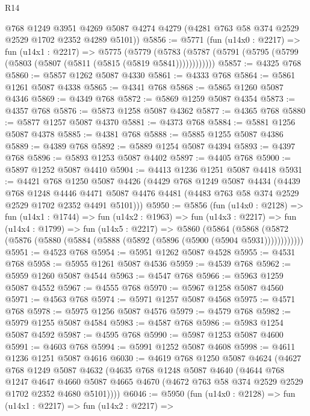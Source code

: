 \begin{lexlean}{R14}
\begin{coremodule}
      @768
      @1249
      @3951
      @4269
      @5087
      @4274
      @4279
      (@4281 @763 @58 @374 @2529 @2529 @1702 @2352 @4289 @5101))
@5856 := @5771
    (fun (u14x0 : @2217) =>
    fun (u14x1 : @2217) =>
    @5775
      (@5779 (@5783 (@5787 (@5791 (@5795 (@5799 (@5803 (@5807 (@5811 (@5815 (@5819 @5841))))))))))))
@5857 := @4325 @768
@5860 := @5857 @1262 @5087 @4330
@5861 := @4333 @768
@5864 := @5861 @1261 @5087 @4338
@5865 := @4341 @768
@5868 := @5865 @1260 @5087 @4346
@5869 := @4349 @768
@5872 := @5869 @1259 @5087 @4354
@5873 := @4357 @768
@5876 := @5873 @1258 @5087 @4362
@5877 := @4365 @768
@5880 := @5877 @1257 @5087 @4370
@5881 := @4373 @768
@5884 := @5881 @1256 @5087 @4378
@5885 := @4381 @768
@5888 := @5885 @1255 @5087 @4386
@5889 := @4389 @768
@5892 := @5889 @1254 @5087 @4394
@5893 := @4397 @768
@5896 := @5893 @1253 @5087 @4402
@5897 := @4405 @768
@5900 := @5897 @1252 @5087 @4410
@5904 := @4413 @1236 @1251 @5087 @4418
@5931 := @4421
    @768
    @1250
    @5087
    @4426
    (@4429
      @768
      @1249
      @5087
      @4434
      (@4439
        @768
        @1248
        @4446
        @4471
        @5087
        @4476
        @4481
        (@4483 @763 @58 @374 @2529 @2529 @1702 @2352 @4491 @5101)))
@5950 := @5856
    (fun (u14x0 : @2128) =>
    fun (u14x1 : @1744) =>
    fun (u14x2 : @1963) =>
    fun (u14x3 : @2217) =>
    fun (u14x4 : @1799) =>
    fun (u14x5 : @2217) =>
    @5860
      (@5864 (@5868 (@5872 (@5876 (@5880 (@5884 (@5888 (@5892 (@5896 (@5900 (@5904 @5931))))))))))))
@5951 := @4523 @768
@5954 := @5951 @1262 @5087 @4528
@5955 := @4531 @768
@5958 := @5955 @1261 @5087 @4536
@5959 := @4539 @768
@5962 := @5959 @1260 @5087 @4544
@5963 := @4547 @768
@5966 := @5963 @1259 @5087 @4552
@5967 := @4555 @768
@5970 := @5967 @1258 @5087 @4560
@5971 := @4563 @768
@5974 := @5971 @1257 @5087 @4568
@5975 := @4571 @768
@5978 := @5975 @1256 @5087 @4576
@5979 := @4579 @768
@5982 := @5979 @1255 @5087 @4584
@5983 := @4587 @768
@5986 := @5983 @1254 @5087 @4592
@5987 := @4595 @768
@5990 := @5987 @1253 @5087 @4600
@5991 := @4603 @768
@5994 := @5991 @1252 @5087 @4608
@5998 := @4611 @1236 @1251 @5087 @4616
@6030 := @4619
    @768
    @1250
    @5087
    @4624
    (@4627
      @768
      @1249
      @5087
      @4632
      (@4635
        @768
        @1248
        @5087
        @4640
        (@4644
          @768
          @1247
          @4647
          @4660
          @5087
          @4665
          @4670
          (@4672 @763 @58 @374 @2529 @2529 @1702 @2352 @4680 @5101))))
@6046 := @5950
    (fun (u14x0 : @2128) =>
    fun (u14x1 : @2217) =>
    fun (u14x2 : @2217) =>

\end{coremodule}
\end{lexlean}
